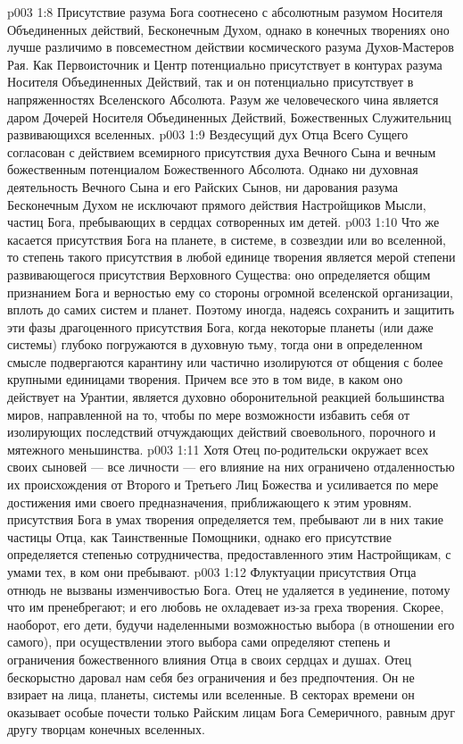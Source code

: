 \vs p003 1:8 Присутствие разума Бога соотнесено с абсолютным разумом Носителя Объединенных действий, Бесконечным Духом, однако в конечных творениях оно лучше различимо в повсеместном действии космического разума Духов\hyp{}Мастеров Рая. Как Первоисточник и Центр потенциально присутствует в контурах разума Носителя Объединенных Действий, так и он потенциально присутствует в напряженностях Вселенского Абсолюта. Разум же человеческого чина является даром Дочерей Носителя Объединенных Действий, Божественных Служительниц развивающихся вселенных.
\vs p003 1:9 Вездесущий дух Отца Всего Сущего согласован с действием всемирного присутствия духа Вечного Сына и вечным божественным потенциалом Божественного Абсолюта. Однако ни духовная деятельность Вечного Сына и его Райских Сынов, ни дарования разума Бесконечным Духом не исключают прямого действия Настройщиков Мысли, частиц Бога, пребывающих в сердцах сотворенных им детей.
\vs p003 1:10 Что же касается присутствия Бога на планете, в системе, в созвездии или во вселенной, то степень такого присутствия в любой единице творения является мерой степени развивающегося присутствия Верховного Существа: оно определяется общим признанием Бога и верностью ему со стороны огромной вселенской организации, вплоть до самих систем и планет. Поэтому иногда, надеясь сохранить и защитить эти фазы драгоценного присутствия Бога, когда некоторые планеты (или даже системы) глубоко погружаются в духовную тьму, тогда они в определенном смысле подвергаются карантину или частично изолируются от общения с более крупными единицами творения. Причем все это в том виде, в каком оно действует на Урантии, является духовно оборонительной реакцией большинства миров, направленной на то, чтобы по мере возможности избавить себя от изолирующих последствий отчуждающих действий своевольного, порочного и мятежного меньшинства.
\vs p003 1:11 \pc Хотя Отец по\hyp{}родительски окружает всех своих сыновей --- все личности --- его влияние на них ограничено отдаленностью их происхождения от Второго и Третьего Лиц Божества и усиливается по мере достижения ими своего предназначения, приближающего к этим уровням.  присутствия Бога в умах творения определяется тем, пребывают ли в них такие частицы Отца, как Таинственные Помощники, однако его  присутствие определяется степенью сотрудничества, предоставленного этим Настройщикам, с умами тех, в ком они пребывают.
\vs p003 1:12 Флуктуации присутствия Отца отнюдь не вызваны изменчивостью Бога. Отец не удаляется в уединение, потому что им пренебрегают; и его любовь не охладевает из\hyp{}за греха творения. Скорее, наоборот, его дети, будучи наделенными возможностью выбора (в отношении его самого), при осуществлении этого выбора сами определяют степень и ограничения божественного влияния Отца в своих сердцах и душах. Отец бескорыстно даровал нам себя без ограничения и без предпочтения. Он не взирает на лица, планеты, системы или вселенные. В секторах времени он оказывает особые почести только Райским лицам Бога Семеричного, равным друг другу творцам конечных вселенных.
